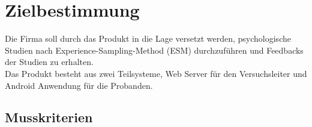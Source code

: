 \documentclass[a4paper]{scrreprt}
\begin{document}


    \chapter{Zielbestimmung}
        Die Firma soll durch das Produkt in die Lage versetzt werden, psychologische Studien nach Experience-Sampling-Method (ESM) durchzuf\"uhren und Feedbacks der Studien zu erhalten.\\

        \noindent Das Produkt besteht aus zwei Teilsysteme, Web Server f\"ur den Versuchsleiter und Android Anwendung f\"ur die Probanden.


        \section{Musskriterien}
            \vspace*{0.3cm}
\end{document}
